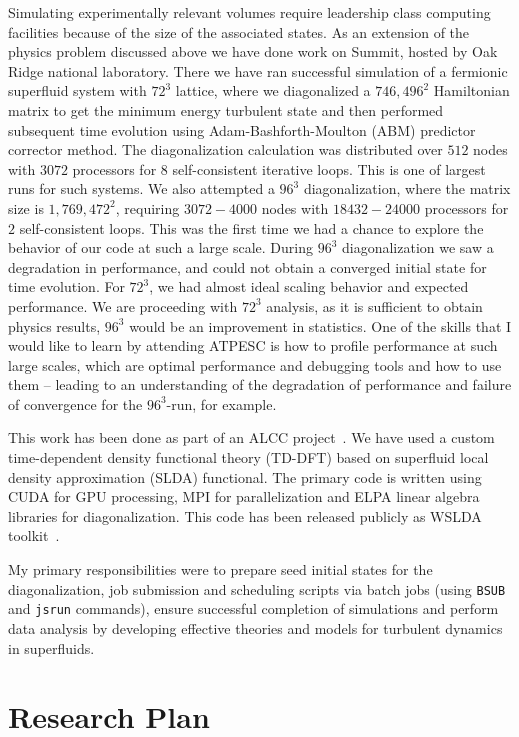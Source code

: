 \documentclass{article}
\begin{document}
Simulating experimentally relevant volumes require leadership class computing
facilities because of the size of the associated states. As an extension of the 
physics problem discussed above we have done work on Summit, hosted by Oak Ridge
national laboratory. There we have ran successful simulation of a fermionic
superfluid system with $72^3$ lattice, where we diagonalized a $746,496^2$ 
Hamiltonian matrix to get the minimum energy turbulent state and then performed
subsequent time evolution using Adam-Bashforth-Moulton (ABM) predictor 
corrector method. The diagonalization calculation was distributed over $512$ 
nodes with $3072$ processors for $8$ self-consistent iterative loops. This is 
one of largest runs for such systems. We
also attempted a $96^3$ diagonalization, where the matrix size is $1,769,472^2$,
requiring $3072 - 4000$ nodes with $18432 - 24000$ processors for $2$ 
self-consistent loops. This was the first time we had a chance to explore the 
behavior of our code at such a large scale. During $96^3$ diagonalization we 
saw a degradation in performance, and could not obtain a converged initial state
for time evolution. For $72^3$, we had almost ideal scaling behavior and 
expected performance. We are proceeding with $72^3$ analysis, as it is sufficient 
to obtain physics results, $96^3$ would be an improvement in statistics. One of
the skills that I would like to learn by attending ATPESC is how to profile
performance at such large scales, which are optimal performance and debugging 
tools and how to use them -- leading to an understanding of the degradation of
performance and failure of convergence for the $96^3$-run, for example.

This work has been done as part of an ALCC project~\cite{Alcc:2021}. We have 
used a custom time-dependent density functional theory (TD-DFT) based on 
superfluid local density approximation (SLDA) functional. The primary code is
written using CUDA for GPU processing, MPI for parallelization and ELPA linear
algebra libraries for diagonalization. This code has been released publicly as
WSLDA toolkit~\cite{Bulgac:2014, W-slda:2023}.

My primary responsibilities were to prepare seed initial states for the 
diagonalization, job submission and scheduling scripts via batch jobs 
(using \verb|BSUB| and \verb|jsrun| commands),
ensure successful completion of simulations and perform data analysis by 
developing effective theories and models for turbulent dynamics in superfluids.

\section*{Research Plan}
\end{document}

